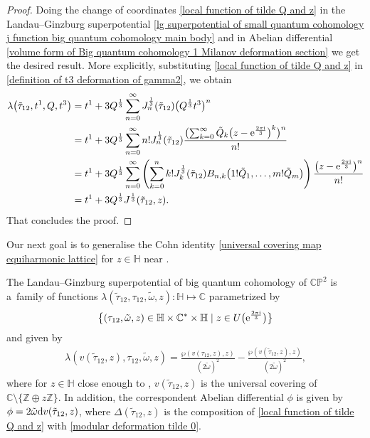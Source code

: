 \begin{proof}
Doing the change of coordinates \eqref{local function of tilde Q and z} in the Landau--Ginzburg superpotential \eqref{lg superpotential of small quantum cohomology j function big quantum cohomology main body} and in Abelian differential \eqref{volume form of Big quantum cohomology 1 Milanov deformation section} we get the desired result. More explicitly, substituting \eqref{local function of tilde Q and z} in \eqref{definition of t3 deformation of gamma2}, we obtain
\begin{align}
\lambda\bigl(\tilde\tau_{12},t^1,Q,t^3\bigr)&=t^1+3Q^{\frac{1}{3}}\sum_{n=0}^{\infty}J_n^{\frac{1}{3}}(\tilde\tau_{12})\bigl( Q^{\frac{1}{3}}t^3\bigr)^n\nonumber\\
&=t^1+3Q^{\frac{1}{3}}\sum_{n=0}^{\infty}n!J_n^{\frac{1}{3}}(\tilde\tau_{12})\frac{\bigl( \sum_{k=0}^{\infty}\tilde Q_k \bigl(z-{\rm e}^{\frac{2\pi {\rm i}}{3}} \bigr)^k \bigr)^n}{n!}\nonumber\\
&=t^1+3Q^{\frac{1}{3}}\sum_{n=0}^{\infty}\left( \sum_{k=0}^{n} k! J_k^{\frac{1}{3}}(\tilde\tau_{12}) B_{n,k}\bigl(1!\tilde Q_1,\dots,m!\tilde Q_m\bigr) \right)\frac{\bigl(z-{\rm e}^{\frac{2\pi {\rm i}}{3}} \bigr)^n}{n!}\nonumber\\
&=t^1+3Q^{\frac{1}{3}}J^{\frac{1}{3}}(\tilde\tau_{12},z).\label{Lg superpotential big quantum cohomology geo iso dif 12}
\end{align}
That concludes the proof.
\end{proof}

Our next goal is to generalise the Cohn identity \eqref{universal covering map equiharmonic lattice} for $z \in \mathbb{H}$ near .

\begin{Theorem}
The Landau--Ginzburg superpotential of big quantum cohomology of $\mathbb{CP}^2$ is a~family of functions
$
\lambda(\tilde\tau_{12}, \tau_{12}, \tilde\omega,z)\colon \mathbb{H} \mapsto \mathbb{C}
$
parametrized by
\begin{gather*}
\bigl\{(\tau_{12},\tilde\omega,z) \in \mathbb{H}\times\mathbb{C}^{*}\times\mathbb{H}\mid z \in U\bigl({\rm e}^{\frac{2\pi {\rm i}}{3}}\bigr) \bigr\}
\end{gather*}
and given by
\begin{gather*}
\lambda(v(\tilde\tau_{12},z),\tau_{12},\tilde\omega,z)=\frac{\wp(v(\tau_{12},z),z)}{\left(2\tilde\omega\right)^2}-\frac{\wp(v(\tilde\tau_{12},z),z)}{\left(2\tilde\omega\right)^2},
\end{gather*}
where for $z\in \mathbb{H}$ close enough to , $v(\tilde\tau_{12},z)$ is the universal covering of $\mathbb{C}\setminus\{\mathbb{Z}\oplus z\mathbb{Z} \}$.
 In addition, the correspondent Abelian differential $\phi$ is given by
$
\phi= 2\tilde\omega {\rm d}v(\tilde\tau_{12},z)$,
where $\Delta(\tilde\tau_{12},z)$ is the composition of \eqref{local function of tilde Q and z} with \eqref{modular deformation tilde 0}.
\end{Theorem}



